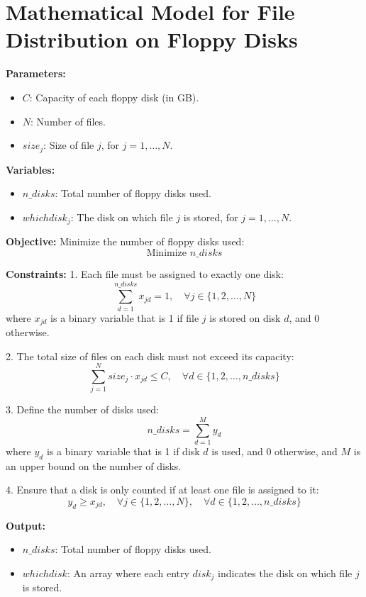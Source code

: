 \documentclass{article}
\begin{document}
\section*{Mathematical Model for File Distribution on Floppy Disks}

\textbf{Parameters:}
\begin{itemize}
    \item $C$: Capacity of each floppy disk (in GB).
    \item $N$: Number of files.
    \item $size_j$: Size of file $j$, for $j = 1, \ldots, N$.
\end{itemize}

\textbf{Variables:}
\begin{itemize}
    \item $n\_disks$: Total number of floppy disks used.
    \item $whichdisk_j$: The disk on which file $j$ is stored, for $j = 1, \ldots, N$.
\end{itemize}

\textbf{Objective:}
Minimize the number of floppy disks used:
\[
\text{Minimize } n\_disks
\]

\textbf{Constraints:}
1. Each file must be assigned to exactly one disk:
\[
\sum_{d=1}^{n\_disks} x_{jd} = 1, \quad \forall j \in \{1, 2, \ldots, N\}
\]
where \( x_{jd} \) is a binary variable that is 1 if file $j$ is stored on disk $d$, and 0 otherwise.

2. The total size of files on each disk must not exceed its capacity:
\[
\sum_{j=1}^{N} size_j \cdot x_{jd} \leq C, \quad \forall d \in \{1, 2, \ldots, n\_disks\}
\]

3. Define the number of disks used:
\[
n\_disks = \sum_{d=1}^{M} y_d
\]
where \( y_d \) is a binary variable that is 1 if disk $d$ is used, and 0 otherwise, and \( M \) is an upper bound on the number of disks.

4. Ensure that a disk is only counted if at least one file is assigned to it:
\[
y_d \geq x_{jd}, \quad \forall j \in \{1, 2, \ldots, N\}, \quad \forall d \in \{1, 2, \ldots, n\_disks\}
\]

\textbf{Output:}
\begin{itemize}
    \item $n\_disks$: Total number of floppy disks used.
    \item $whichdisk$: An array where each entry $disk_j$ indicates the disk on which file $j$ is stored.
\end{itemize}
\end{document}
